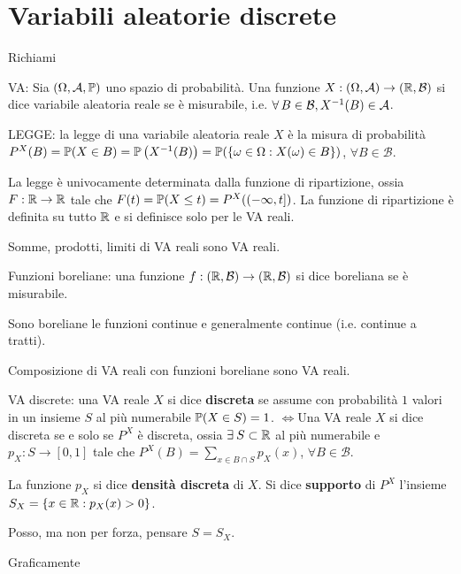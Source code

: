 
\chapter{Variabili aleatorie discrete}

\ParteEsercizi

Richiami

VA: Sia $(\Omega,\mathcal{A},\mathbb{P})$ uno spazio di probabilità. Una funzione $X:(\Omega ,\mathcal{A})\rightarrow (\mathbb{R} ,\mathcal{B})$ si dice variabile aleatoria reale se è misurabile, i.e. $\forall B\in \mathcal{B} ,X^{-1}(B) \in \Ac$.

LEGGE: la legge di una variabile aleatoria reale $X$ è la misura di probabilità $P^{X}(B) =\mathbb{P}(X\in B) =\mathbb{P}\left(X^{-1}(B)\right) =\mathbb{P}(\{\omega \in \Omega :X(\omega) \in B\})$, $\forall B\in \mathcal{B}$.
\begin{rem}
	La legge è univocamente determinata dalla funzione di ripartizione, ossia $F:\mathbb{R}\rightarrow \mathbb{R}$ tale che $F(t) =\mathbb{P}(X\leq t) =P^{X}((-\infty ,t])$. La funzione di ripartizione è definita su tutto $\mathbb{R}$ e si definisce solo per le VA reali.
\end{rem}
\begin{rem}
Somme, prodotti, limiti di VA reali sono VA reali.
\end{rem}
Funzioni boreliane: una funzione $f:(\mathbb{R} ,\mathcal{B})\rightarrow (\mathbb{R} ,\mathcal{B})$ si dice boreliana se è misurabile.
\begin{rem}
Sono boreliane le funzioni continue e generalmente continue (i.e. continue a tratti).
\end{rem}
\begin{rem}
Composizione di VA reali con funzioni boreliane sono VA reali.
\end{rem}
VA discrete: una VA reale $X$ si dice \textbf{discreta} se assume con probabilità $1$ valori in un insieme $S$ al più numerabile $\mathbb{P}(X\in S) =1$. $\iff $Una VA reale $X$ si dice discreta se e solo se $P^{X}$ è discreta, ossia $\exists S\subset \RR$ al più numerabile e $p_{X} :S\rightarrow [0,1]$ tale che $P^{X}(B) =\sum\limits_{x\in B\cap S} p_{X}(x)$, $\forall B\in \mathcal{B}$.

La funzione $p_{X}$ si dice \textbf{densità discreta} di $X$. Si dice \textbf{supporto} di $P^{X}$ l'insieme $S_{X} =\{x\in \mathbb{R} :p_{X}(x)  >0\}$.
\begin{rem}
Posso, ma non per forza, pensare $S=S_{X}$.
\end{rem}
Graficamente


